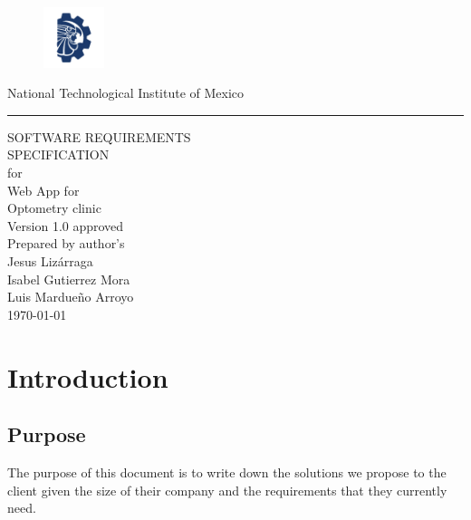 \documentclass{scrreprt}
\date{}
\def\myversion{1.0 }
\begin{document}
	\begin{figure}
		\includegraphics[width=50pt,height=50pt]{tecnm.PNG}
	\end{figure}
	
	\raggedright \large National Technological Institute of Mexico\vskip0.5cm
		\rule{20cm}{5pt}\vskip0.5cm
		\begin{bfseries}
			
			\begin{flushright}
			\Huge{SOFTWARE REQUIREMENTS\\ SPECIFICATION}\\
			\vspace{1.2cm}
			for\\
			\vspace{0.5cm}
			\Huge Web App for\\ Optometry clinic\\
			\vspace{1.6cm}
			\LARGE Version \myversion approved\\
			\vspace{1.3cm}
			Prepared by author's\\
			\vspace{0.2cm}
			Jesus Lizárraga\\
			\vspace{0.2cm}
			Isabel Gutierrez Mora\\
			\vspace{0.2cm}
			Luis Mardueño Arroyo\\
			
			\vspace{0.7cm}
			\today\\
		\end{flushright}
		
		\end{bfseries}
	
		
	
	
	\tableofcontents
	
	
	\chapter{Introduction}
	
	\section{Purpose}
	The purpose of this document is to write down the solutions we propose to the client given the size of their company and the requirements that they currently need.
	
\end{document}
